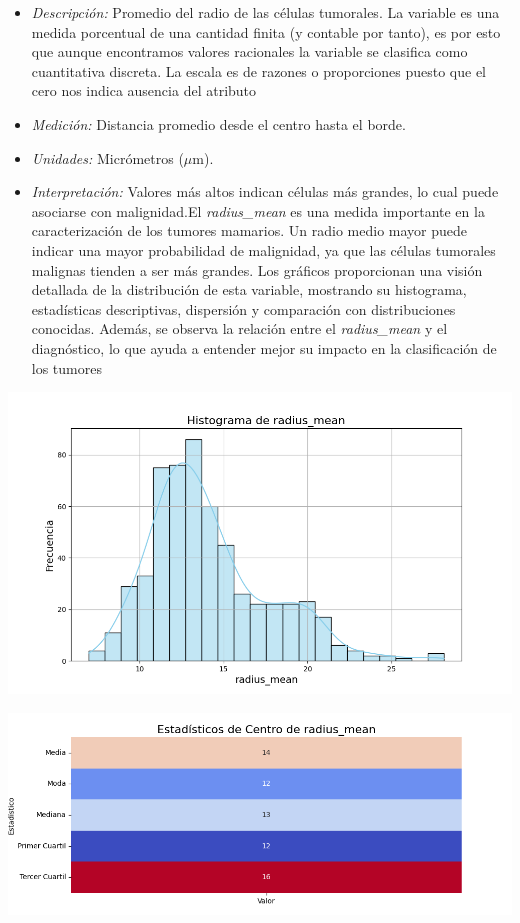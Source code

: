 \documentclass[a4paper, 12pt]{article}
\begin{document}
 \begin{itemize}
	\item \textit{Descripción:} Promedio del radio de las células tumorales. La variable es una medida porcentual de una cantidad finita (y contable por tanto), es por esto que aunque encontramos valores racionales la variable se clasifica como cuantitativa discreta. La escala es de razones o proporciones puesto que el cero nos indica ausencia del atributo
	\item \textit{Medición:} Distancia promedio desde el centro hasta el borde.
	\item \textit{Unidades:} Micrómetros ($\mu$m).
	\item \textit{Interpretación:} Valores más altos indican células más grandes, lo cual puede asociarse con malignidad.El \textit{radius\_mean} es una medida importante en la caracterización de los tumores mamarios. Un radio medio mayor puede indicar una mayor probabilidad de malignidad, ya que las células tumorales malignas tienden a ser más grandes. Los gráficos proporcionan una visión detallada de la distribución de esta variable, mostrando su histograma, estadísticas descriptivas, dispersión y comparación con distribuciones conocidas. Además, se observa la relación entre el \textit{radius\_mean} y el diagnóstico, lo que ayuda a entender mejor su impacto en la clasificación de los tumores
\end{itemize}

	\includegraphics[width=\textwidth]{../Plots/plots_stats/radius_mean/histograma_radius_mean.png}

\includegraphics[width=\textwidth]{../Plots/plots_stats/radius_mean/estadisticas_centro_radius_mean.png}
\end{document}
